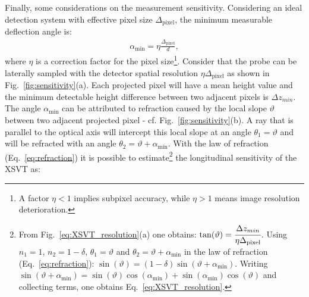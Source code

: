 \begin{refsection}
Finally, some considerations on the measurement sensitivity. Considering an ideal detection system with effective pixel size $\Delta_\text{pixel}$, the minimum measurable deflection angle is:
\begin{align}\label{eq:alpha_min}
    \alpha_\text{min}=\eta\frac{\Delta_\text{pixel}}{d},
\end{align}
where $\eta$ is a correction factor for the pixel size\footnote{A factor $\eta<1$ implies subpixel accuracy, while $\eta>1$
means image resolution deterioration.}. Consider that the probe can be laterally sampled with the detector spatial resolution $\eta\Delta_\text{pixel}$ as shown in Fig.~\ref{fig:sensitivity}(a). Each projected pixel will have a mean height value and the minimum detectable height difference between two adjacent pixels is $\Delta{z_{min}}$. The angle $\alpha_\text{min}$ can be attributed to refraction caused by the local slope $\vartheta$ between two adjacent projected pixel - cf. Fig.~\ref{fig:sensitivity}(b). A ray that is parallel to the optical axis will intercept this local slope at an angle $\theta_1=\vartheta$ and will be refracted with an angle $\theta_2=\vartheta+\alpha_\text{min}$. With the law of refraction (Eq.~\ref{eq:refraction}) it is possible to estimate\footnote{From Fig.~\ref{eq:XSVT_resolution}(a) one obtains: $\tan(\vartheta)=\cfrac{\Delta{z_{min}}}{\eta\Delta_\text{pixel}}$. Using $n_1=1$, $n_2=1-\delta$, $\theta_1=\vartheta$ and  $\theta_2=\vartheta+\alpha_\text{min}$ in the law of refraction (Eq.~\ref{eq:refraction}): $\sin(\vartheta)=(1-\delta)\sin(\vartheta+\alpha_\text{min})$. Writing $\sin(\vartheta+\alpha_\text{min})=\sin(\vartheta)\cos(\alpha_\text{min})+\sin(\alpha_\text{min})\cos(\vartheta)$ and collecting terms, one obtains Eq.~\ref{eq:XSVT_resolution}.
} the longitudinal sensitivity of the XSVT as: 

\end{refsection}
